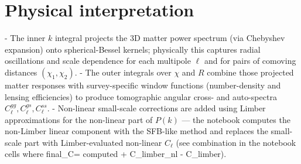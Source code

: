 \documentclass{article}
\begin{document}
\section*{Physical interpretation}
- The inner $k$ integral projects the 3D matter power spectrum (via Chebyshev expansion) onto spherical-Bessel kernels; physically this captures radial oscillations and scale dependence for each multipole $\ell$ and for pairs of comoving distances $(\chi_1,\chi_2)$. 
- The outer integrals over $\chi$ and $R$ combine those projected matter responses with survey-specific window functions (number-density and lensing efficiencies) to produce tomographic angular cross- and auto-spectra $C_\ell^{gg}, C_\ell^{gs}, C_\ell^{ss}$. 
- Non-linear small-scale corrections are added using Limber approximations for the non-linear part of $P(k)$ — the notebook computes the non-Limber linear component with the SFB-like method and replaces the small-scale part with Limber-evaluated non-linear $C_\ell$ (see combination in the notebook cells where final_C\ell = computed + C\ell_limber_nl - C\ell_limber).
\end{document}
